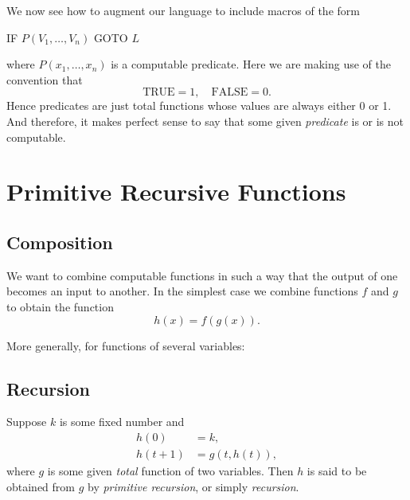 \documentclass[a4paper,10pt,twoside]{book}
\begin{document}
We now see how to augment our language to include macros of the form
\begin{center}
    IF $P(V_1,\ldots,V_n)$ GOTO $L$
\end{center}
where $P(x_1,\ldots,x_n)$ is a computable predicate. Here we are making use of the convention that $$\text{TRUE}=1,\quad\text{FALSE}=0.$$ Hence predicates are just total functions whose values are always either 0 or 1. And therefore, it makes perfect sense to say that some given \textit{predicate} is or is not computable.

\chapter{Primitive Recursive Functions}
\section{Composition}

We want to combine computable functions in such a way that the output of one becomes an input to another. In the simplest case we combine functions $f$ and $g$ to obtain the function $$h(x)=f(g(x)).$$

More generally, for functions of several variables:



\section{Recursion}

Suppose $k$ is some fixed number and
\begin{equation}
    \begin{aligned}h(0)&=k,\\h(t+1)&=g(t,h(t)),\end{aligned}
    \label{2.1}
\end{equation}
where $g$ is some given \textit{total} function of two variables. Then $h$ is said to be obtained from $g$ by \textit{primitive recursion}, or simply \textit{recursion}.
\end{document}
